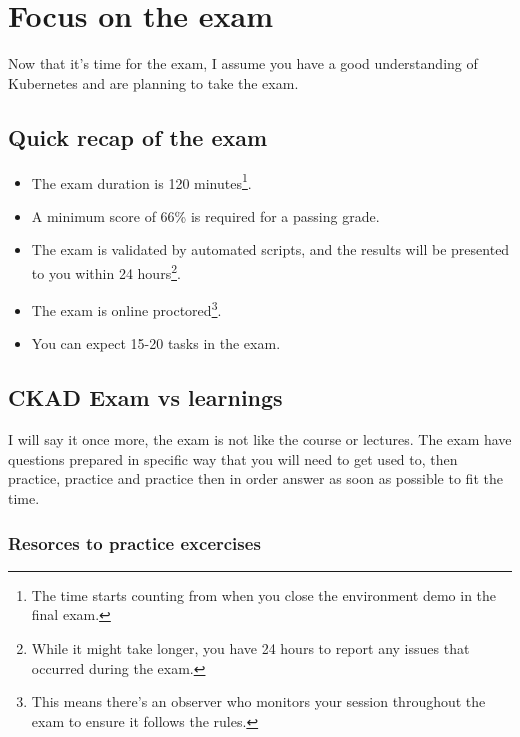 
\section{Focus on the exam}
\label{sec:focus-on-exam}

Now that it's time for the exam, I assume you have a good understanding of Kubernetes and are planning to take the exam.

\subsection{Quick recap of the exam}

\begin{itemize}
	\item The exam duration is 120 minutes\footnote{The time starts counting from when you close the environment demo in the final exam.}.
	\item A minimum score of 66\% is required for a passing grade.
	\item The exam is validated by automated scripts, and the results will be presented to you within 24 hours\footnote{While it might take longer, you have 24 hours to report any issues that occurred during the exam.}.
	\item The exam is online proctored\footnote{This means there's an observer who monitors your session throughout the exam to ensure it follows the rules.}.
	\item You can expect 15-20 tasks in the exam.
\end{itemize}
 

\subsection{CKAD Exam vs learnings}

I will say it once more, the exam is not like the course or lectures. The exam have questions prepared in specific way that you will need to get used to, then practice, practice and practice then in order answer as soon as possible to fit the time.

\subsubsection{Resorces to practice excercises}
\label{subsubsec:resources-to-practice-excercises}

